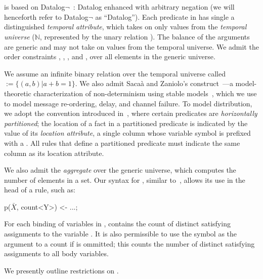 \section{\large \bf \lang}
\label{sec:slang}

\lang is based on Datalog$\lnot$~\cite{ullmanbook}: Datalog enhanced with arbitrary negation (we will henceforth refer to Datalog$\lnot$ as ``Datalog'').  Each predicate in \lang has single a distinguished {\em temporal attribute}, which takes on only values from the {\em temporal universe} ($\mathbb{N}$, represented by the unary relation ). The balance of the arguments are generic and may not take on values from the temporal universe.  We admit the order constraints \dedalus{<}, \dedalus{=}, \dedalus{!=}, and \dedalus{<=}, over all elements in the generic universe.

We assume an infinite binary relation over the temporal universe called  $:= \{\left(a,b\right) | a + b = 1\}$.  We also admit Saca\`{a} and Zaniolo's  construct~\cite{sacaa-zaniolo}---a model-theoretic characterization of non-determinism using stable models~\cite{stable-model}, which we use to model message re-ordering, delay, and channel failure.  To model distribution, we adopt the convention introduced in~\cite{Loo:2005}, where certain predicates are {\em horizontally partitioned};  the location of a fact in a partitioned predicate is indicated by the value of its {\em location attribute}, a single column whose variable symbol is prefixed with a \dedalus{\#}.  All rules that define a partitioned predicate must indicate the same column as its location attribute.

We also admit the  {\em aggregate} over the generic universe, which computes the number of elements in a set.  Our syntax for , similar to~\cite{datalog-agg}, allows its use in the head of a rule, such as:

\begin{Dedalus}
p(\(\bar{X}\), count<Y>) <- ...;
\end{Dedalus}

For each binding of variables in ,  contains the count of distinct satisfying assignments to the variable .  It is also permissible to use the symbol \dedalus{*} as the argument to a count if  is ommitted; this counts the number of distinct satisfying assignments to all body variables.

We presently outline restrictions on \lang.

